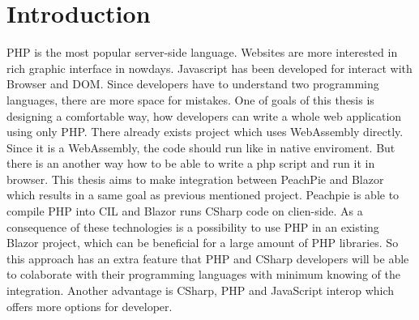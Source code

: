 \chapter*{Introduction}

PHP is the most popular server-side language.
Websites are more interested in rich graphic interface in nowdays.
Javascript has been developed for interact with Browser and DOM.
Since developers have to understand two programming languages, there are more space for  mistakes. 
One of goals of this thesis is designing a comfortable way, how developers can write a whole web application using only PHP.
There already exists project \cite{Pib} which uses WebAssembly directly. 
Since it is a WebAssembly, the code should run like in native enviroment.
But there is an another way how to be able to write a php script and run it in browser.
This thesis aims to make integration between PeachPie and Blazor which results in a same goal as previous mentioned project.
Peachpie is able to compile PHP into CIL and Blazor runs CSharp code on clien-side.
As a consequence of these technologies is a possibility to use PHP in an existing Blazor project, which can be beneficial for a large amount of PHP libraries. 
So this approach has an extra feature that PHP and CSharp developers will be able to colaborate with their programming languages with minimum knowing of the integration. Another advantage is CSharp, PHP and JavaScript interop which offers more options for developer.
